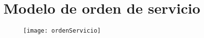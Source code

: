 \hypertarget{anexoOrdenServicio}{%
\section{Modelo de orden de servicio}
}
\begin{figure}[H]
\centering
\texttt{[image: ordenServicio]}
\end{figure}
